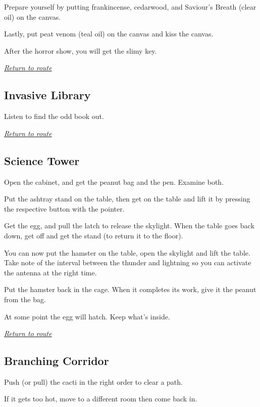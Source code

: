 \documentclass[a5paper]{extarticle}
\begin{document}
Prepare yourself by putting frankincense, cedarwood, and Saviour's Breath (clear oil) on the canvas.

Lastly, put peat venom (teal oil) on the canvas and kiss the canvas.

After the horror show, you will get the slimy key.

\hyperref[sec:route-10]{\emph{Return to route}}

\newpage
\subsection{Invasive Library}\label{sec:sol-Invasive-Library}

Listen to find the odd book out.

\hyperref[sec:route-10]{\emph{Return to route}}

\newpage
\subsection{Science Tower}\label{sec:sol-Science-Tower}

Open the cabinet, and get the peanut bag and the pen. Examine both.

Put the ashtray stand on the table,
then get on the table and lift it by pressing the respective button with the pointer.

Get the egg, and pull the latch to release the skylight.
When the table goes back down, get off and get the stand (to return it to the floor).

You can now put the hamster on the table, open the skylight and lift the table.
Take note of the interval between the thunder and lightning so you can activate the antenna at the right time.

Put the hamster back in the cage. When it completes its work, give it the peanut from the bag.

At some point the egg will hatch. Keep what's inside.

\hyperref[sec:route-10]{\emph{Return to route}}

\newpage
\subsection{Branching Corridor}\label{sec:sol-Branching-Corridor}

Push (or pull) the cacti in the right order to clear a path.

If it gets too hot, move to a different room then come back in.
\end{document}
